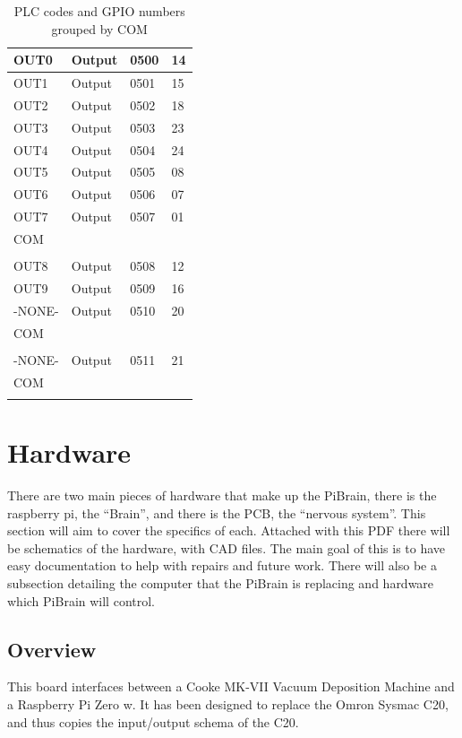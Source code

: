 \documentclass{article}
\begin{document}
\begin{table}[h!]
\begin{tabular}{|l|l|l|l|}
    OUT0 & Output & 0500 & 14 \\ \hline
    OUT1 & Output & 0501 & 15 \\ \hline
    OUT2 & Output & 0502 & 18 \\ \hline
    OUT3 & Output & 0503 & 23 \\ \hline
    OUT4 & Output & 0504 & 24 \\ \hline
    OUT5 & Output & 0505 & 08 \\ \hline
    OUT6 & Output & 0506 & 07 \\ \hline
    OUT7 & Output & 0507 & 01 \\ \hline
    COM & & & \\ \hline
    & & & \\ \hline
    OUT8 & Output & 0508 & 12 \\ \hline
    OUT9 & Output & 0509 & 16 \\ \hline
    -NONE- & Output & 0510 & 20 \\ \hline
    COM & & & \\ \hline
    & & & \\ \hline
    -NONE- & Output & 0511 & 21 \\ \hline
    COM & & & \\ \hline
    & & & \\ \hline
    \end{tabular}
\caption{PLC codes and GPIO numbers grouped by COM}
\label{table:pin_def_t}
\end{table} 

\section{Hardware}
There are two main pieces of hardware that make up the PiBrain, there is the raspberry pi, the ``Brain'', and there is the PCB, the ``nervous system''. This section will aim to cover the specifics of each. Attached with this PDF there will be schematics of the hardware, with CAD files. The main goal of this is to have easy documentation to help with repairs and future work. There will also be a subsection detailing the computer that the PiBrain is replacing and hardware which PiBrain will control.

\subsection{Overview}
This board interfaces between a Cooke MK-VII Vacuum Deposition Machine and a Raspberry Pi Zero w. It has been designed to replace the Omron Sysmac C20, and thus copies the input/output schema of the C20.\\
\end{document}
